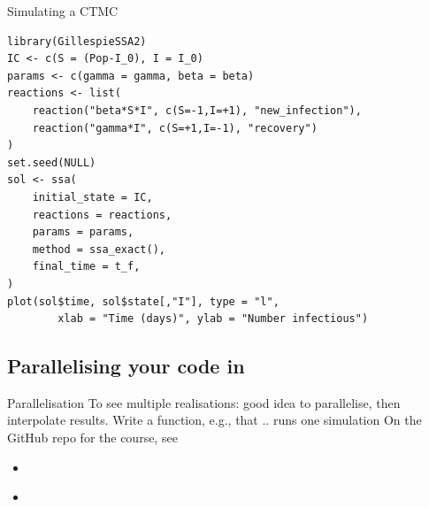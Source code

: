 \documentclass[aspectratio=169]{beamer}\usepackage[]{graphicx}\usepackage[]{xcolor}
\begin{document}

\begin{frame}[fragile]{Simulating a CTMC}
\begin{lstlisting}[language=Renhanced]
library(GillespieSSA2)
IC <- c(S = (Pop-I_0), I = I_0)
params <- c(gamma = gamma, beta = beta)
reactions <- list(
    reaction("beta*S*I", c(S=-1,I=+1), "new_infection"),
    reaction("gamma*I", c(S=+1,I=-1), "recovery")
)
set.seed(NULL)
sol <- ssa(
    initial_state = IC,
    reactions = reactions,
    params = params,
    method = ssa_exact(),
    final_time = t_f,
)
plot(sol$time, sol$state[,"I"], type = "l",
        xlab = "Time (days)", ylab = "Number infectious")    
\end{lstlisting}
\end{frame}


\subsection{Parallelising your code in }

\begin{frame}{Parallelisation}
    To see multiple realisations: good idea to parallelise, then interpolate results. Write a function, e.g.,   that .. runs one simulation
    \vfill
    On the GitHub repo for the course, see
    \begin{itemize}
        \item \href{https://raw.githubusercontent.com/julien-arino/3MC-2024-02-Potch/main/julien/CODE/SIS-CTMC-parallel.R}{}
        \item \href{https://raw.githubusercontent.com/julien-arino/3MC-2024-02-Potch/main/julien/CODE/SIS-CTMC-parallel-multiple-R0.R}{}
    \end{itemize}
\end{frame}
\end{document}

